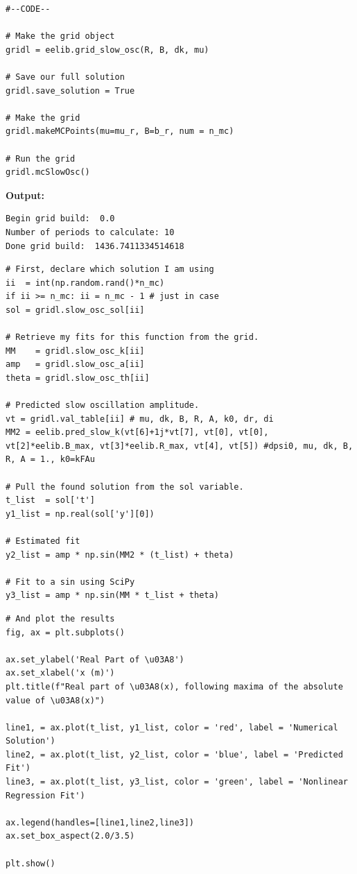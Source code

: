 \documentclass{article}
\begin{document}
\begin{lstlisting}
#--CODE--

# Make the grid object
gridl = eelib.grid_slow_osc(R, B, dk, mu)

# Save our full solution
gridl.save_solution = True

# Make the grid
gridl.makeMCPoints(mu=mu_r, B=b_r, num = n_mc)

# Run the grid
gridl.mcSlowOsc()\end{lstlisting}

\textbf{Output:}\begin{verbatim}
Begin grid build:  0.0
Number of periods to calculate: 10
Done grid build:  1436.7411334514618

\end{verbatim}

\begin{lstlisting}
# First, declare which solution I am using
ii  = int(np.random.rand()*n_mc)
if ii >= n_mc: ii = n_mc - 1 # just in case
sol = gridl.slow_osc_sol[ii]

# Retrieve my fits for this function from the grid.
MM    = gridl.slow_osc_k[ii]
amp   = gridl.slow_osc_a[ii]
theta = gridl.slow_osc_th[ii]

# Predicted slow oscillation amplitude.
vt = gridl.val_table[ii] # mu, dk, B, R, A, k0, dr, di
MM2 = eelib.pred_slow_k(vt[6]+1j*vt[7], vt[0], vt[0], vt[2]*eelib.B_max, vt[3]*eelib.R_max, vt[4], vt[5]) #dpsi0, mu, dk, B, R, A = 1., k0=kFAu

# Pull the found solution from the sol variable.
t_list  = sol['t']
y1_list = np.real(sol['y'][0])

# Estimated fit
y2_list = amp * np.sin(MM2 * (t_list) + theta)

# Fit to a sin using SciPy
y3_list = amp * np.sin(MM * t_list + theta)\end{lstlisting}

\begin{lstlisting}
# And plot the results
fig, ax = plt.subplots()

ax.set_ylabel('Real Part of \u03A8')
ax.set_xlabel('x (m)')
plt.title(f"Real part of \u03A8(x), following maxima of the absolute value of \u03A8(x)")

line1, = ax.plot(t_list, y1_list, color = 'red', label = 'Numerical Solution')
line2, = ax.plot(t_list, y2_list, color = 'blue', label = 'Predicted Fit')
line3, = ax.plot(t_list, y3_list, color = 'green', label = 'Nonlinear Regression Fit')

ax.legend(handles=[line1,line2,line3])
ax.set_box_aspect(2.0/3.5)

plt.show()\end{lstlisting}
\end{document}
